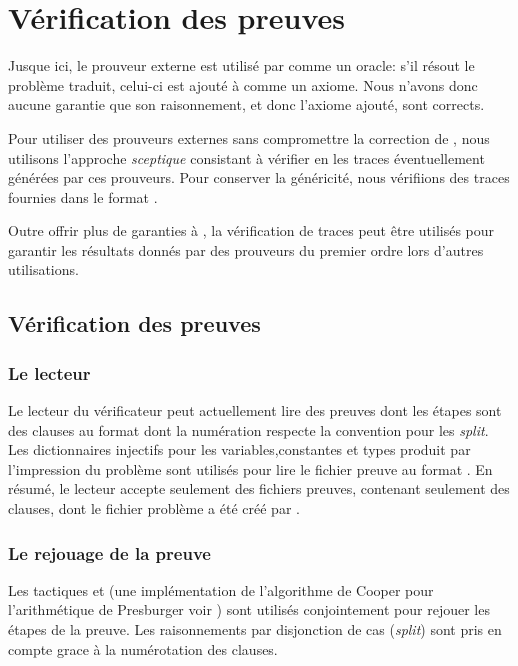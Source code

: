 \section{Vérification des preuves \tff}
\label{sec:traces}

Jusque ici, le prouveur externe est utilisé par \holfour comme un
oracle: s'il résout le problème traduit, celui-ci est ajouté à \holfour
comme un axiome. Nous n'avons donc aucune garantie que son raisonnement,
et donc l'axiome ajouté, sont corrects.

Pour utiliser des prouveurs externes sans compromettre la correction de
\holfour, nous utilisons l'approche \emph{sceptique} consistant à
vérifier en \holfour les traces éventuellement générées par ces
prouveurs. Pour conserver la généricité, nous vérifiions des traces
fournies dans le format \tff.

Outre offrir plus de garanties à \holfour, la vérification de traces
\tff peut être utilisés pour garantir les résultats donnés par des
prouveurs du premier ordre lors d'autres utilisations.


\subsection{Vérification des preuves}

\subsubsection{Le lecteur}
Le lecteur du vérificateur peut actuellement lire des preuves dont les étapes sont des clauses au format \tff dont la numération respecte la convention \tff pour les \textit{split}. Les dictionnaires injectifs pour les variables,constantes et types produit par l'impression du problème sont utilisés pour lire le fichier preuve au format \tff. En résumé, le lecteur accepte seulement des fichiers preuves, contenant seulement des clauses, dont le fichier problème a été créé par \holfour.

\subsubsection{Le rejouage de la preuve}
Les tactiques \metistac et \coopertac (une implémentation de l'algorithme de Cooper pour l'arithmétique de Presburger voir \cite{Norrish03completeinteger})
sont utilisés conjointement pour rejouer les étapes de la preuve. 
Les raisonnements par disjonction de cas (\textit{split}) sont pris en compte grace à la numérotation des clauses.


